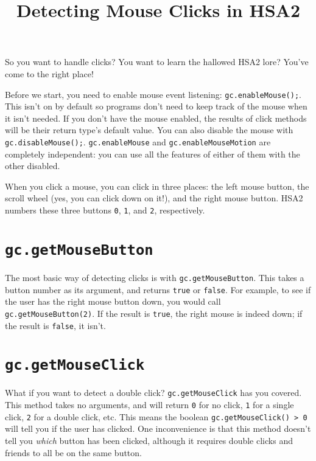 \documentclass{article}
\title{Detecting Mouse Clicks in HSA2}
\date{}
\begin{document}
\maketitle
\thispagestyle{empty}

So you want to handle clicks? You want to learn the hallowed HSA2 lore? You've come to the right place!

Before we start, you need to enable mouse event listening: \texttt{gc.enableMouse();}. This isn't on by default so programs don't need to keep track of the mouse when it isn't needed. If you don't have the mouse enabled, the results of click methods will be their return type's default value. You can also disable the mouse with \texttt{gc.disableMouse();}. \texttt{gc.enableMouse} and \texttt{gc.enableMouseMotion} are completely independent: you can use all the features of either of them with the other disabled.

When you click a mouse, you can click in three places: the left mouse button, the scroll wheel (yes, you can click down on it!), and the right mouse button. HSA2 numbers these three buttons \texttt{0}, \texttt{1}, and \texttt{2}, respectively.

\section*{\texttt{gc.getMouseButton}}
The most basic way of detecting clicks is with \texttt{gc.getMouseButton}. This takes a button number as its argument, and returns \texttt{true} or \texttt{false}. For example, to see if the user has the right mouse button down, you would call \texttt{gc.getMouseButton(2)}. If the result is \texttt{true}, the right mouse is indeed down; if the result is \texttt{false}, it isn't.

\section*{\texttt{gc.getMouseClick}}
What if you want to detect a double click? \texttt{gc.getMouseClick} has you covered. This method takes no arguments, and will return \texttt{0} for no click, \texttt{1} for a single click, \texttt{2} for a double click, etc. This means the boolean \texttt{gc.getMouseClick() > 0} will tell you if the user has clicked. One inconvenience is that this method doesn't tell you \textit{which} button has been clicked, although it requires double clicks and friends to all be on the same button.
\end{document}
